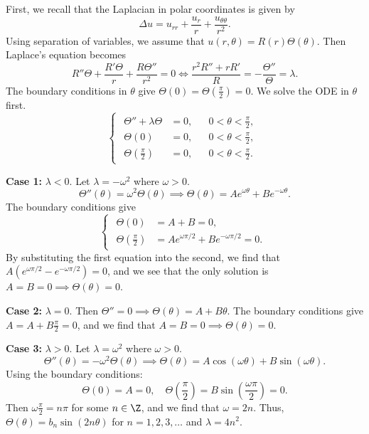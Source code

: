 \documentclass[plain]{pset}
\begin{document}
\begin{solution}
    First, we recall that the Laplacian in polar coordinates is given by
    \[
        \Delta u = u_{rr} + \frac{u_r}{r} + \frac{u_{\theta\theta}}{r^2}.
    \]
    Using separation of variables, we assume that \(u(r, \theta) = R(r)\Theta(\theta)\). Then Laplace's equation becomes
    \[
        R''\Theta + \frac{R'\Theta}{r} + \frac{R\Theta''}{r^2} = 0 \iff \frac{r^2R'' + rR'}{R} = -\frac{\Theta''}{\Theta} = \lambda.
    \]
    The boundary conditions in \(\theta\) give \(\Theta(0) = \Theta\left(\frac{\pi}{2}\right) = 0\). We solve the ODE in \(\theta\) first.
    \[
        \begin{cases}
            \begin{aligned}
                \Theta'' + \lambda\Theta         & = 0, &  & 0 < \theta < \frac{\pi}{2}, \\
                \Theta(0)                        & = 0, &  & 0 < \theta < \frac{\pi}{2}, \\
                \Theta\left(\frac{\pi}{2}\right) & = 0, &  & 0 < \theta < \frac{\pi}{2}.
            \end{aligned}
        \end{cases}
    \]

    \textbf{Case 1:} \(\lambda < 0\). Let \(\lambda = -\omega^2\) where \(\omega > 0\).
    \[\Theta''(\theta) = \omega^2 \Theta(\theta) \implies \Theta(\theta) = Ae^{\omega\theta} + Be^{-\omega\theta}.\]
    The boundary conditions give
    \[
        \begin{cases}
            \begin{aligned}
                \Theta(0)                        & = A + B = 0,                                \\
                \Theta\left(\frac{\pi}{2}\right) & = Ae^{\omega\pi/2} + Be^{-\omega\pi/2} = 0.
            \end{aligned}
        \end{cases}
    \]
    By substituting the first equation into the second, we find that \(A\left(e^{\omega\pi/2} - e^{-\omega\pi/2}\right) = 0\), and we see that the only solution is \(A = B = 0 \implies \Theta(\theta) = 0\).

    \textbf{Case 2:} \(\lambda = 0\). Then \(\Theta'' = 0 \implies \Theta(\theta) = A + B\theta\). The boundary conditions give \(A = A + B\frac{\pi}{2} = 0\), and we find that \(A = B = 0 \implies \Theta(\theta) = 0\).

    \textbf{Case 3:} \(\lambda > 0\). Let \(\lambda = \omega^2\) where \(\omega > 0\).
    \[\Theta''(\theta) = -\omega^2 \Theta(\theta) \implies \Theta(\theta) = A\cos(\omega\theta) + B\sin(\omega\theta).\]
    Using the boundary conditions:
    \[\Theta(0) = A = 0, \quad \Theta\left(\frac{\pi}{2}\right) = B\sin\left(\frac{\omega\pi}{2}\right) = 0.\]
    Then \(\omega\frac{\pi}{2} = n\pi\) for some \(n \in \Z\), and we find that \(\omega = 2n\). Thus, \(\Theta(\theta) = b_n\sin(2n\theta)\) for \(n = 1, 2, 3, \ldots\) and \(\lambda = 4n^2\).


\end{solution}
\end{document}
